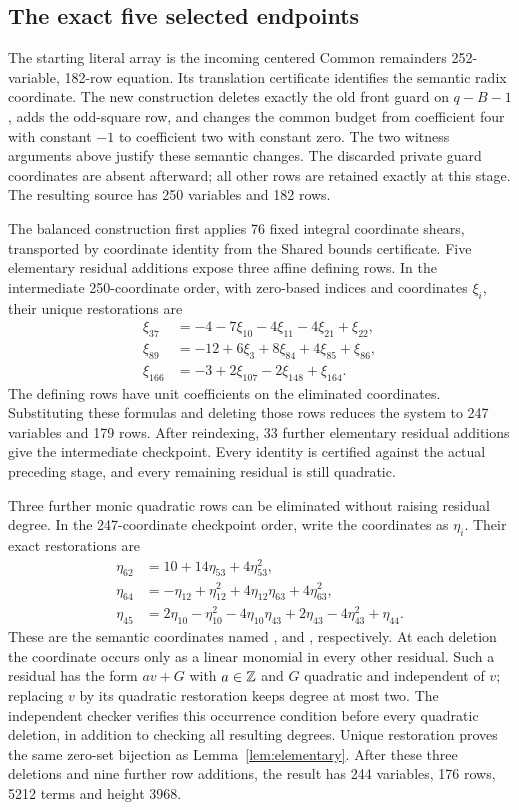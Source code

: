 \subsection{The exact five selected endpoints}
The starting literal array is the incoming centered Common remainders
252-variable, 182-row equation. Its translation certificate identifies the
semantic radix coordinate. The new construction deletes exactly the old
front guard on $q-B-1$, adds the odd-square row, and changes the common
budget from coefficient four with constant $-1$ to coefficient two with
constant zero. The two witness arguments above justify these semantic
changes. The discarded private guard coordinates are absent afterward;
all other rows are retained exactly at this stage. The resulting source
has 250 variables and 182 rows.

The balanced construction first applies 76 fixed integral coordinate shears,
transported by coordinate identity from the Shared bounds certificate.
Five elementary residual additions expose three affine defining rows.
In the intermediate 250-coordinate order, with zero-based indices and
coordinates $\xi_i$, their unique restorations are
\begin{align*}
 \xi_{37}&=-4-7\xi_{10}-4\xi_{11}-4\xi_{21}+\xi_{22},\\
 \xi_{89}&=-12+6\xi_3+8\xi_{84}+4\xi_{85}+\xi_{86},\\
 \xi_{166}&=-3+2\xi_{107}-2\xi_{148}+\xi_{164}.
\end{align*}
The defining rows have unit coefficients on the eliminated coordinates.
Substituting these formulas and deleting those rows reduces the system to
247 variables and 179 rows. After reindexing, 33 further elementary
residual additions give the intermediate  checkpoint. Every identity is certified
against the actual preceding stage, and every remaining residual is still
quadratic.

Three further monic quadratic rows can be eliminated without raising
residual degree. In the 247-coordinate checkpoint order, write the coordinates
as $\eta_i$. Their exact restorations are
\begin{align*}
 \eta_{62}&=10+14\eta_{53}+4\eta_{53}^2,\\
 \eta_{64}&=-\eta_{12}+\eta_{12}^2+4\eta_{12}\eta_{63}+4\eta_{63}^2,\\
 \eta_{45}&=2\eta_{10}-\eta_{10}^2-4\eta_{10}\eta_{43}
            +2\eta_{43}-4\eta_{43}^2+\eta_{44}.
\end{align*}
These are the semantic coordinates named , 
and , respectively. At each deletion the coordinate occurs
only as a linear monomial in every other residual. Such a residual has the
form $av+G$ with $a\in\mathbb Z$ and $G$ quadratic and independent of $v$;
replacing $v$ by its quadratic restoration keeps degree at most two.
The independent checker verifies this occurrence condition before every
quadratic deletion, in addition to checking all resulting degrees. Unique
restoration proves the same zero-set bijection as Lemma~\ref{lem:elementary}.
After these three deletions and nine further row additions, the result has
244 variables, 176 rows, 5212 terms and height 3968.


